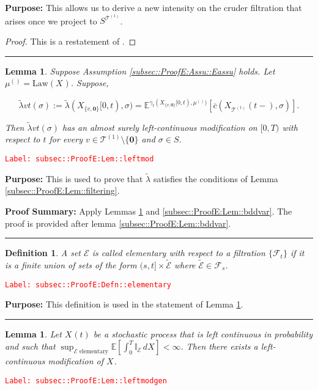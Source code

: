 \documentclass[12pt]{article}
\newcommand{\mb}{\mathbb}
\newcommand{\mc}{\mathcal}
\newcommand{\ov}{\overline}
\newcommand{\te}{\text}
\newcommand{\tr}{\textcolor{red}}
\newcommand{\labe}[1]{\tr{\texttt{Label: #1}}}
\newcommand{\purpose}{\textbf{Purpose: }}
\newcommand{\pfsum}{\textbf{Proof Summary: }}
\newcommand{\lin}{\rule{\linewidth}{0.4 pt}}
\newcommand{\ex}[1]{\mb{E}\left[#1\right]}			%
\newcommand{\exmu}[2]{\mb{E}^{#1}\left[#2\right]}	%
\renewcommand{\root}{\mathbf{0}}				%
\renewcommand{\v}{v}							%
\renewcommand{\S}{S}							%
\newcommand{\s}{\sigma}							%
\newcommand{\T}{T}								%
\renewcommand{\t}{t}							%
\renewcommand{\tt}{s}							%
\newcommand{\F}{\mc{F}}							%
\newcommand{\X}{X}								%
\newcommand{\carp}[1]{^{#1}}					%
\newcommand{\vsi}[1]{^{#1}}						%
\newcommand{\cind}[1]{_{#1}}					%
\newcommand{\tp}[1]{(#1)}						%
\newcommand{\tip}[1]{#1}						%
\newcommand{\ts}[1]{_{#1}}						%
\newcommand{\IGrg}{\ov{c}}						%
\newcommand{\tree}{\mc{T}}						%
\newcommand{\sln}[1]{^{(#1)}}					%
\newcommand{\alt}[1]{\widetilde{#1}}			%
\newcommand{\m}{\mu}							%
\newcommand{\cm}{\gamma}						%
\newcommand{\law}{\te{Law}}						%
\newcommand{\evnt}{\mc{E}}						%
\newcommand{\crate}{\alt{\lambda}}				%
\newtheorem{lem}[thms]{Lemma}
\newtheorem{defn}[thms]{Definition}
\begin{document}
\purpose This allows us to derive a new intensity on the cruder filtration that arises once we project to \(\S\carp{\tree\sln{1}}\).

\begin{proof}
This is a restatement of \cite[Theorem 14.3.III]{DalVer08}.
\end{proof}

\lin

\begin{lem}
Suppose Assumption \ref{subsec::ProofE:Assu::Eassu} holds. Let \(\m\sln{}\ts{} = \law(\X\cind{}\tip{})\). Suppose,

\[\crate{\v}{\t}(\s) := \crate{}{}(\X\cind{\{\v,\root\}}\tip{[0,\t)},\s) = \exmu{\cm\ts{\t}(\X\cind{\{\v,\root\}}\tip{[0,\t)},\m\sln{}\ts{})}{\IGrg(\X\cind{\tree\sln{1}}\tp{\t-},\s)}.\]


Then \(\crate{\v}{\t}(\s)\) has an almost surely left-continuous modification on \([0,\T)\) with respect to \(\t\) for every \(\v \in \tree\sln{1}\setminus\{\root\}\) and \(\s \in \S\).
\label{subsec::ProofE:Lem::leftmod}
\end{lem}
\labe{subsec::ProofE:Lem::leftmod}

\purpose This is used to prove that \(\crate{}{}\) satisfies the conditions of Lemma \ref{subsec::ProofE:Lem::filtering}.

\pfsum Apply Lemmas \ref{subsec::ProofE:Lem::leftmodgen} and \ref{subsec::ProofE:Lem::bddvar}. The proof is provided after lemma \ref{subsec::ProofE:Lem::bddvar}.

\lin

\begin{defn}
A set \(\evnt{}\) is called elementary with respect to a filtration \(\{\F\vsi{}\ts{\t}\}\) if it is a finite union of sets of the form \((\tt,\t]\times \alt{\evnt}\) where \(\alt{\evnt} \in \F\vsi{}\ts{\tt}\).
\label{subsec::ProofE:Defn::elementary}
\end{defn}
\labe{subsec::ProofE:Defn::elementary}

\purpose This definition is used in the statement of Lemma \ref{subsec::ProofE:Lem::leftmodgen}.

\lin

\begin{lem}
Let \(\X\cind{}\tp{\t}\) be a stochastic process that is left continuous in probability and such that \(\sup_{\evnt{}\te{ elementary}}\ex{\int_0^\T \mb{I}_\evnt{}\,d\X\cind{}\tip{}} < \infty\). Then there exists a left-continuous modification of \(\X\cind{}\tip{}\).
\label{subsec::ProofE:Lem::leftmodgen}
\end{lem}
\labe{subsec::ProofE:Lem::leftmodgen}
\end{document}

